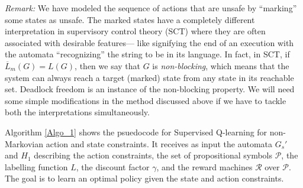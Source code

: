 \documentclass[letterpaper, 10 pt, conference]{ieeeconf}
\begin{document}
\textit{Remark:} We have modeled the sequence of actions that are unsafe by ``marking'' some states as unsafe. The marked states have a completely different interpretation in supervisory control theory (SCT) where they are often associated with desirable features--- like signifying the end of an execution with the automata ``recognizing'' the string to be in its language. In fact, in SCT, if $\overline{L}_m(G) = L(G)$, then we say that $G$ is \textit{non-blocking}, which means that the system can always reach a target (marked) state from any state in its reachable set. Deadlock freedom is an instance of the non-blocking property. We will need some simple modifications in the method discussed above if we have to tackle both the interpretations simultaneously.

Algorithm \ref{Algo_1} shows the psuedocode for Supervised Q-learning for non-Markovian action and state constraints. It receives as input the automata $G_s'$ and $H_1$ describing the action constraints, the set of propositional symbols $\mathcal{P}$, the labelling function $L$, the discount factor $\gamma$, and the reward machines $\mathcal{R}$ over $\mathcal{P}$. The goal is to learn an optimal policy given the state and action constraints.
\end{document}
